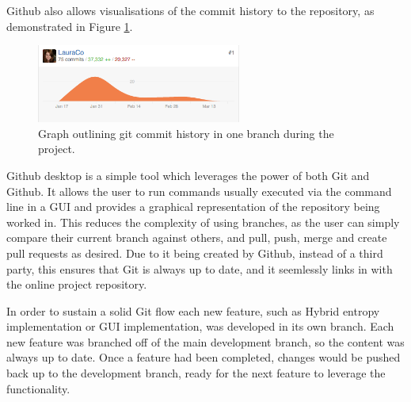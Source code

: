 Github also allows visualisations of the commit history to the repository, as demonstrated in Figure \ref{fig:git-graph}.

\begin{figure}[H]
  \centering
  \includegraphics[width=0.6\textwidth]{Chapter2/tools/git_graph.png}
  \caption{Graph outlining git commit history in one branch during the project.}
  \label{fig:git-graph}
\end{figure}

Github desktop \cite{github_desktop} is a simple tool which leverages the power of both Git and Github. It allows the user to run commands usually executed via the command line in a \acrshort{GUI} and provides a graphical representation of the repository being worked in. This reduces the complexity of using branches, as the user can simply compare their current branch against others, and pull, push, merge and create pull requests as desired. Due to it being created by Github, instead of a third party, this ensures that Git is always up to date, and it seemlessly links in with the online project repository.

In order to sustain a solid Git flow each new feature, such as Hybrid entropy implementation or \acrshort{GUI} implementation, was developed in its own branch. Each new feature was branched off of the  main development branch, so the content was always up to date. Once a feature had been completed, changes would be pushed back up to the development branch, ready for the next feature to leverage the functionality.
